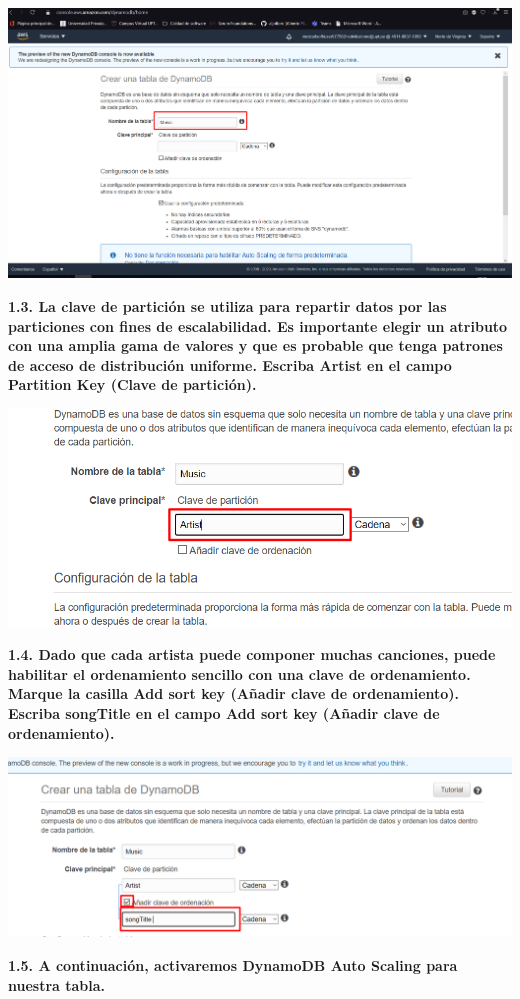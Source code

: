 \documentclass{article}
\begin{document}
    \begin{center}
		\includegraphics[width=15cm]{./images/2} 
	\end{center}
\newpage
\textbf{1.3. La clave de partición se utiliza para repartir datos por las particiones con fines de escalabilidad. Es importante elegir un atributo con una amplia gama de valores y que es probable que tenga patrones de acceso de distribución uniforme. Escriba Artist en el campo Partition Key (Clave de partición).
}

    \begin{center}
		\includegraphics[width=15cm]{./images/3} 
	\end{center}


\textbf{1.4. Dado que cada artista puede componer muchas canciones, puede habilitar el ordenamiento sencillo con una clave de ordenamiento. Marque la casilla Add sort key (Añadir clave de ordenamiento). Escriba songTitle en el campo Add sort key (Añadir clave de ordenamiento). }

    \begin{center}
		\includegraphics[width=15cm]{./images/4} 
	\end{center}
	\newpage
\textbf{1.5. A continuación, activaremos DynamoDB Auto Scaling para nuestra tabla.
}
\end{document}
